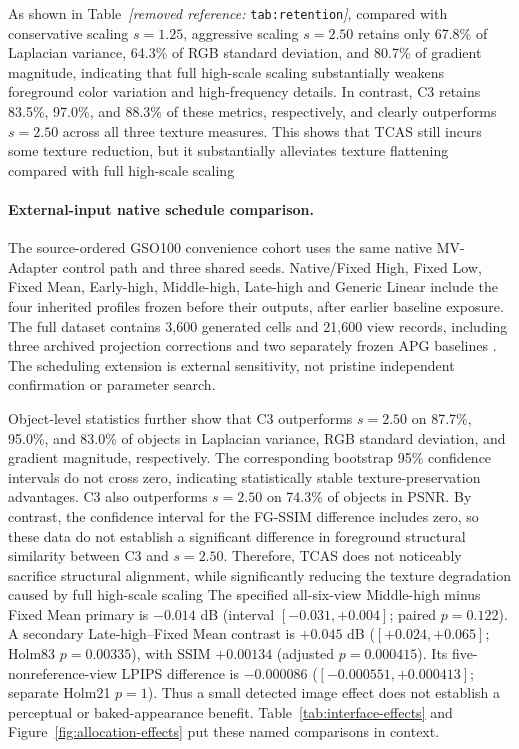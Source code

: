 \documentclass[times,twocolumn,final]{elsarticle}
\providecommand{\DIFadd}[1]{{\protect\color{blue} \sf #1}} %
\providecommand{\DIFdel}[1]{{\protect\color{red} \scriptsize #1}} %
\providecommand{\DIFaddbegin}{} %
\providecommand{\DIFaddend}{} %
\providecommand{\DIFdelbegin}{} %
\providecommand{\DIFdelend}{} %
\begin{document}
\DIFdelbegin \DIFdel{As shown in Table~\textit{[removed reference: }\texttt{tab:retention}\textit{]}, compared with conservative scaling $s = 1.25$, aggressive scaling $s = 2.50$ retains only 67.8\% of Laplacian variance, 64.3\% of RGB standard deviation, and 80.7\% of gradient magnitude, indicating that full high-scale scaling substantially weakens foreground color variation and high-frequency details. In contrast, C3 retains 83.5\%, 97.0\%, and 88.3\% of these metrics, respectively, and clearly outperforms $s = 2.50$ across all three texture measures. This shows that TCAS still incurs some texture reduction, but it substantially alleviates texture flattening compared with full high-scale scaling}\DIFdelend \DIFaddbegin \paragraph{External-input native schedule comparison.}
\DIFadd{The source-ordered GSO100 convenience cohort uses the same native MV-Adapter control path and three shared seeds. Native/Fixed High, Fixed Low, Fixed Mean, Early-high, Middle-high, Late-high and Generic Linear include the four inherited profiles frozen before their outputs, after earlier baseline exposure. The full dataset contains 3,600 generated cells and 21,600 view records, including three archived projection corrections and two separately frozen APG baselines \cite{sad2024apg}. The scheduling extension is external sensitivity, not pristine independent confirmation or parameter search}\DIFaddend .

\DIFdelbegin \DIFdel{Object-level statistics further show that C3 outperforms $s = 2.50$ on 87.7\%, 95.0\%, and 83.0\% of objects in Laplacian variance, RGB standard deviation, and gradient magnitude, respectively. The corresponding bootstrap 95\% confidence intervals do not cross zero, indicating statistically stable texture-preservation advantages. C3 also outperforms $s = 2.50$ on 74.3\% of objects in PSNR. By contrast, the confidence interval for the FG-SSIM difference includes zero, so these data do not establish a significant difference in foreground structural similarity between C3 and $s = 2.50$. Therefore, TCAS does not noticeably sacrifice structural alignment, while significantly reducing the texture degradation caused by full high-scale scaling}\DIFdelend \DIFaddbegin \DIFadd{The specified all-six-view Middle-high minus Fixed Mean primary is $-0.014$ dB (interval $[-0.031,+0.004]$; paired $p=0.122$)}\DIFaddend . \DIFaddbegin \DIFadd{A secondary Late-high--Fixed Mean contrast is $+0.045$ dB ($[+0.024,+0.065]$; Holm83 $p=0.00335$), with SSIM $+0.00134$ (adjusted $p=0.000415$). Its five-nonreference-view LPIPS difference is $-0.000086$ ($[-0.000551,+0.000413]$; separate Holm21 $p=1$). Thus a small detected image effect does not establish a perceptual or baked-appearance benefit. Table~\ref{tab:interface-effects} and Figure~\ref{fig:allocation-effects} put these named comparisons in context.
}\DIFaddend 
\end{document}

